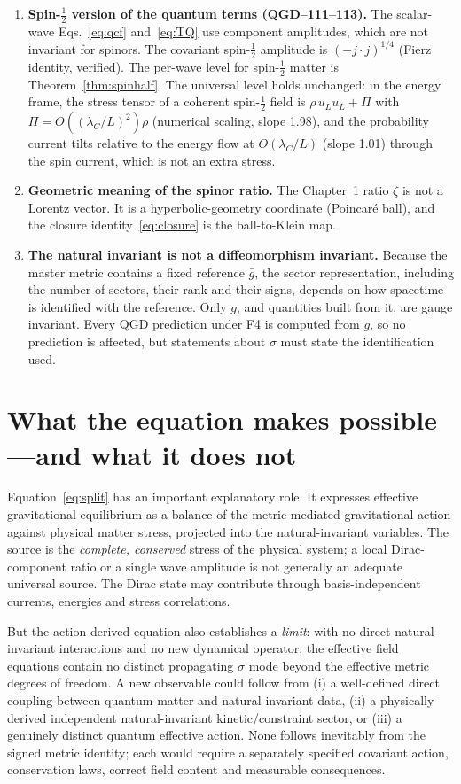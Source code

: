 \documentclass[11pt,a4paper]{article}
\begin{document}
\begin{enumerate}
\item \textbf{Spin-$\frac12$ version of the quantum terms (QGD--111--113).} The scalar-wave
Eqs.~\eqref{eq:qcf} and~\eqref{eq:TQ} use component amplitudes, which are not
invariant for spinors. The covariant spin-$\frac12$ amplitude is $(-j\cdot j)^{1/4}$
(Fierz identity, verified). The per-wave level for spin-$\frac12$ matter is
Theorem~\ref{thm:spinhalf}. The universal level holds unchanged: in the energy frame,
the stress tensor of a coherent spin-$\frac12$ field is $\rho\,u_Lu_L+\Pi$ with
$\Pi=O((\lambda_C/L)^2)\rho$ (numerical scaling, slope 1.98), and the probability
current tilts relative to the energy flow at $O(\lambda_C/L)$ (slope 1.01) through the
spin current, which is not an extra stress.
\item \textbf{Geometric meaning of the spinor ratio.} The Chapter~1 ratio $\zeta$
is not a Lorentz vector. It is a hyperbolic-geometry coordinate (Poincar\'e
ball), and the closure identity~\eqref{eq:closure} is the ball-to-Klein map.
\item \textbf{The natural invariant is not a diffeomorphism invariant.}
Because the master metric contains a fixed reference $\bar g$, the sector
representation, including the number of sectors, their rank and their signs,
depends on how spacetime is identified with the reference. Only $g$, and
quantities built from it, are gauge invariant. Every QGD prediction under F4 is
computed from $g$, so no prediction is affected, but statements about $\sigma$
must state the identification used.
\end{enumerate}

\section{What the equation makes possible---and what it does not}
\label{sec:physics}
Equation~\eqref{eq:split} has an important explanatory role.
It expresses effective gravitational equilibrium as a balance of the
metric-mediated gravitational action against physical matter stress,
projected into the natural-invariant variables. The source is the
\emph{complete, conserved} stress of the physical system; a local
Dirac-component ratio or a single wave amplitude is not generally an
adequate universal source. The Dirac state may contribute through
basis-independent currents, energies and stress correlations.

But the action-derived equation also establishes a \emph{limit}:
with no direct natural-invariant interactions and no new dynamical
operator, the effective field equations contain no distinct
propagating $\sigma$ mode beyond the effective metric degrees of
freedom. A new observable could follow from (i) a well-defined direct
coupling between quantum matter and natural-invariant data, (ii) a
physically derived independent natural-invariant kinetic/constraint
sector, or (iii) a genuinely distinct quantum effective action.
None follows inevitably from the signed metric identity; each would
require a separately specified covariant action, conservation laws,
correct field content and measurable consequences.
\end{document}
